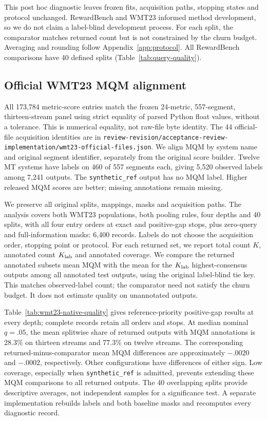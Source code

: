 This post hoc diagnostic leaves frozen fits, acquisition paths, stopping states and protocol unchanged. RewardBench and WMT23 informed method development, so we do not claim a label-blind development process. For each split, the comparator matches returned count but is not constrained by the churn budget. Averaging and rounding follow Appendix~\ref{app:protocol}. All RewardBench comparisons have 40 defined splits (Table~\ref{tab:query-quality}).


\subsection{Official WMT23 MQM alignment}
All 173,784 metric-score entries match the frozen 24-metric, 557-segment, thirteen-stream panel using strict equality of parsed Python float values, without a tolerance. This is numerical equality, not raw-file byte identity. The 44 official-file acquisition identities are in \nolinkurl{review-revision/acceptance-review-implementation/wmt23-official-files.json}. We align MQM by system name and original segment identifier, separately from the original score builder. Twelve MT systems have labels on 460 of 557 segments each, giving 5,520 observed labels among 7,241 outputs. The \texttt{synthetic\_ref} output has no MQM label. Higher released MQM scores are better; missing annotations remain missing.

We preserve all original splits, mappings, masks and acquisition paths. The analysis covers both WMT23 populations, both pooling rules, four depths and 40 splits, with all four entry orders at exact and positive-gap stops, plus zero-query and full-information masks: 6,400 records. Labels do not choose the acquisition order, stopping point or protocol. For each returned set, we report total count $K$, annotated count $K_{\rm lab}$ and annotated coverage. We compare the returned annotated subset\textquotesingle s mean MQM with the mean for the $K_{\rm lab}$ highest-consensus outputs among all annotated test outputs, using the original label-blind tie key. This matches observed-label count; the comparator need not satisfy the churn budget. It does not estimate quality on unannotated outputs.

Table~\ref{tab:wmt23-native-quality} gives reference-priority positive-gap results at every depth; complete records retain all orders and stops. At median nominal $q=.05$, the mean splitwise share of returned outputs with MQM annotations is 28.3\% on thirteen streams and 77.3\% on twelve streams. The corresponding returned-minus-comparator mean MQM differences are approximately $-.0020$ and $-.0002$, respectively. Other configurations have differences of either sign. Low coverage, especially when \texttt{synthetic\_ref} is admitted, prevents extending these MQM comparisons to all returned outputs. The 40 overlapping splits provide descriptive averages, not independent samples for a significance test. A separate implementation rebuilds labels and both baseline masks and recomputes every diagnostic record.


